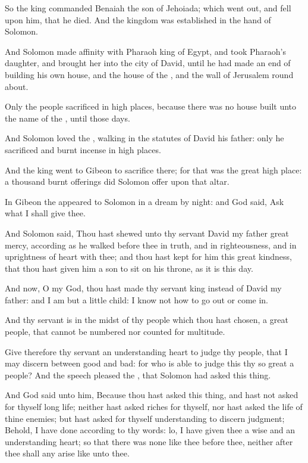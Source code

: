 \Verse So the king commanded Benaiah the son of Jehoiada; which went out, and fell upon him, that he died. And the kingdom was established in the hand of Solomon.


\Chapter
\Verse And Solomon made affinity with Pharaoh king of Egypt, and took Pharaoh's daughter, and brought her into the city of David, until he had made an end of building his own house, and the house of the \LORD, and the wall of Jerusalem round about.

\Verse Only the people sacrificed in high places, because there was no house built unto the name of the \LORD, until those days.

\Verse And Solomon loved the \LORD, walking in the statutes of David his father: only he sacrificed and burnt incense in high places.

\Verse And the king went to Gibeon to sacrifice there; for that was the great high place: a thousand burnt offerings did Solomon offer upon that altar.

\Verse In Gibeon the \LORD appeared to Solomon in a dream by night: and God said, Ask what I shall give thee.

\Verse And Solomon said, Thou hast shewed unto thy servant David my father great mercy, according as he walked before thee in truth, and in righteousness, and in uprightness of heart with thee; and thou hast kept for him this great kindness, that thou hast given him a son to sit on his throne, as it is this day.

\Verse And now, O \LORD my God, thou hast made thy servant king instead of David my father: and I am but a little child: I know not how to go out or come in.

\Verse And thy servant is in the midst of thy people which thou hast chosen, a great people, that cannot be numbered nor counted for multitude.

\Verse Give therefore thy servant an understanding heart to judge thy people, that I may discern between good and bad: for who is able to judge this thy so great a people?  \Verse And the speech pleased the \LORD, that Solomon had asked this thing.

\Verse And God said unto him, Because thou hast asked this thing, and hast not asked for thyself long life; neither hast asked riches for thyself, nor hast asked the life of thine enemies; but hast asked for thyself understanding to discern judgment; \Verse Behold, I have done according to thy words: lo, I have given thee a wise and an understanding heart; so that there was none like thee before thee, neither after thee shall any arise like unto thee.

